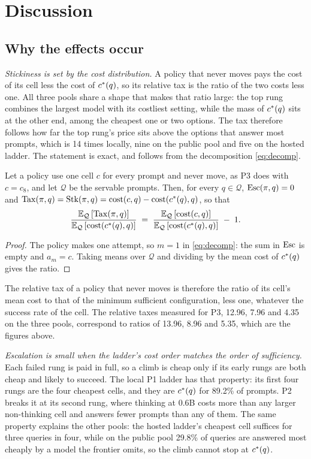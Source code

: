 \section{Discussion}
\label{sec:discussion}

\subsection{Why the effects occur}
\label{sec:why}

\emph{Stickiness is set by the cost distribution.} A policy that never moves
pays the cost of its cell less the cost of $c^{*}(q)$, so its relative tax
is the ratio of the two costs less one. All three pools share a shape that
makes that ratio large: the top rung combines the largest model with its
costliest setting, while the mass of $c^{*}(q)$ sits at the other end, among
the cheapest one or two options. The tax therefore follows how far the top
rung's price sits above the options that answer most prompts, which is 14
times locally, nine on the public pool and five on the hosted ladder. The
statement is exact, and follows from the decomposition \eqref{eq:decomp}.

\begin{proposition}
\label{prop:sticky}
Let a policy use one cell $c$ for every prompt and never move, as P3 does with
$c = c_8$, and let $\mathcal{Q}$ be the servable prompts. Then, for every
$q \in \mathcal{Q}$, $\mathrm{Esc}(\pi, q) = 0$ and
$\mathrm{Tax}(\pi, q) = \mathrm{Stk}(\pi, q) = \mathrm{cost}(c, q) - \mathrm{cost}(c^{*}(q), q)$, so that
\[
  \frac{\mathbb{E}_{\mathcal{Q}}\,[\mathrm{Tax}(\pi, q)]}
       {\mathbb{E}_{\mathcal{Q}}\,[\mathrm{cost}(c^{*}(q), q)]}
  \;=\; \frac{\mathbb{E}_{\mathcal{Q}}\,[\mathrm{cost}(c, q)]}
             {\mathbb{E}_{\mathcal{Q}}\,[\mathrm{cost}(c^{*}(q), q)]} \;-\; 1 .
\]
\end{proposition}
\begin{proof}
The policy makes one attempt, so $m = 1$ in \eqref{eq:decomp}: the sum in
$\mathrm{Esc}$ is empty and $a_m = c$. Taking means over $\mathcal{Q}$ and dividing by
the mean cost of $c^{*}(q)$ gives the ratio.
\end{proof}
The relative tax of a policy that never moves is therefore the ratio of its
cell's mean cost to that of the minimum sufficient configuration, less one,
whatever the success rate of the cell. The relative taxes measured for P3,
12.96, 7.96 and 4.35 on the three pools, correspond to ratios of 13.96, 8.96
and 5.35, which are the figures above.

\emph{Escalation is small when the ladder's cost order matches the order of
sufficiency.} Each failed rung is paid in full, so a climb is cheap only if
its early rungs are both cheap and likely to succeed. The local P1 ladder has
that property: its first four rungs are the four cheapest cells, and they are
$c^{*}(q)$ for 89.2\% of prompts. P2 breaks it at its second rung, where
thinking at 0.6B costs more than any larger non-thinking cell and answers
fewer prompts than any of them. The same property explains the other pools:
the hosted ladder's cheapest cell suffices for three queries in four, while
on the public pool 29.8\% of queries are answered most cheaply by a model the
frontier omits, so the climb cannot stop at $c^{*}(q)$.

